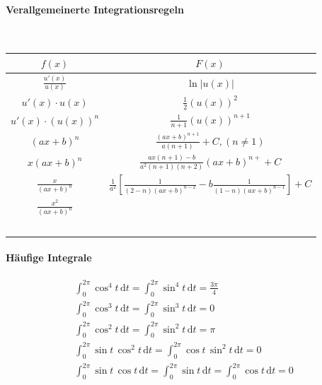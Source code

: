 \documentclass[a4paper,10pt]{article}
\begin{document}
\paragraph{Verallgemeinerte Integrationsregeln} \
\begin{table}[H]
    \centering
    \begin{tabular}{cc}
        \( f(x)\) & \( F(x)\) \\
        \hline \hline
        \( \frac{u'(x)}{u(x)} \) & \( \ln \lvert u(x) \rvert \) \\
        \hline
        \( u'(x) \cdot u(x) \) & \( \frac{1}{2} (u(x))^2 \) \\
        \hline
        \( u'(x) \cdot (u(x))^n \) & \( \frac{1}{n + 1} (u(x))^{n + 1} \) \\
        \hline
        \((ax+b)^n\) & \(\frac{(ax+b)^{n+1}}{a(n+1)}+C ,(n\neq1)\)\\
        \hline
        \(x(ax+b)^n\) & \(\frac{ax(n+1)-b}{a^2(n+1)(n+2)}(ax+b)^{n+}+C\)\\
        \hline
        \(\frac{x}{(ax+b)^n}\)&\(\frac{1}{a^2}\left[\frac{1}{(2-n)(ax+b)^{n-2}}-b\frac{1}{(1-n)(ax+b)^{n-1}}\right]+C\)\\
        \hline
        \(\frac{x^2}{(ax+b)^n}\)&\(\)\\
        \hline
        \(\)&\(\)\\
    \end{tabular}
\end{table}

\paragraph{Häufige Integrale}
\begin{gather*}
    \int_0^{2\pi} \cos^4 t \, \mathrm{d}t = \int_0^{2\pi} \sin^4 t \, \mathrm{d}t = \frac{3\pi}{4} \\
    \int_0^{2\pi} \cos^3 t \, \mathrm{d}t = \int_0^{2\pi} \sin^3 t \, \mathrm{d}t = 0 \\
    \int_0^{2\pi} \cos^2 t \, \mathrm{d}t = \int_0^{2\pi}\sin^2 t \, \mathrm{d}t = \pi \\
    \int_0^{2\pi} \sin t \, \cos^2 t \, \mathrm{d}t = \int_0^{2\pi} \cos t \, \sin^2 t \, \mathrm{d}t = 0 \\
    \int_0^{2\pi} \sin t \, \cos t \, \mathrm{d}t = \int_0^{2\pi} \sin t \, \mathrm{d}t = \int_0^{2\pi} \cos t \, \mathrm{d}t = 0
\end{gather*}
\end{document}
